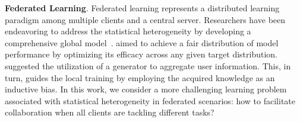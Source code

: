 \textbf{Federated Learning}. 
Federated learning represents a distributed learning paradigm among multiple clients and a central server.
Researchers have been endeavoring to address the  statistical heterogeneity by developing a comprehensive global model~\citep{DBLP:conf/iclr/WangYSPK20}.
\cite{mohri2019agnostic} aimed to achieve a fair distribution of model performance by optimizing its efficacy across any given target distribution.
\cite{DBLP:conf/icml/ZhuHZ21} suggested the utilization of a generator to aggregate user information. This, in turn, guides the local training by employing the acquired knowledge as an inductive bias.
In this work, we consider a more challenging learning problem associated with statistical heterogeneity in federated scenarios: how to facilitate collaboration when all clients are tackling different tasks?

